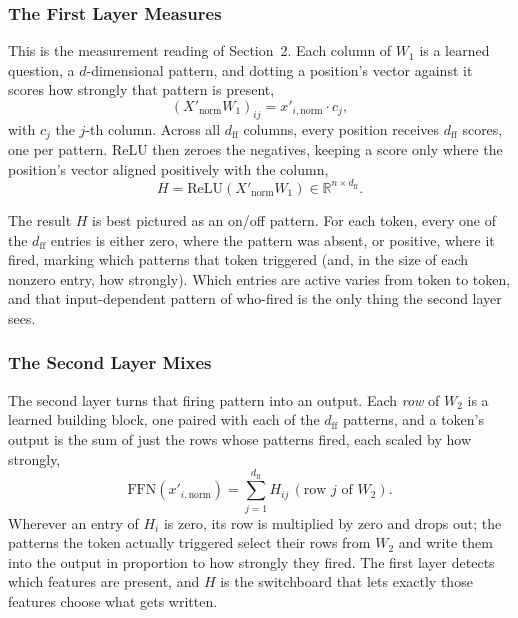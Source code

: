 \documentclass[11pt]{article}
\begin{document}
\subsubsection*{The First Layer Measures}

This is the measurement reading of Section~2. Each column of $W_1$ is a learned question, a $d$-dimensional pattern, and dotting a position's vector against it scores how strongly that pattern is present,
\[
(X'_{\text{norm}} W_1)_{ij} = x'_{i,\text{norm}} \cdot c_j,
\]
with $c_j$ the $j$-th column. Across all $d_{\text{ff}}$ columns, every position receives $d_{\text{ff}}$ scores, one per pattern. ReLU then zeroes the negatives, keeping a score only where the position's vector aligned positively with the column,
\[
H = \text{ReLU}(X'_{\text{norm}} W_1) \in \mathbb{R}^{n \times d_{\text{ff}}}.
\]

The result $H$ is best pictured as an on/off pattern. For each token, every one of the $d_{\text{ff}}$ entries is either zero, where the pattern was absent, or positive, where it fired, marking which patterns that token triggered (and, in the size of each nonzero entry, how strongly). Which entries are active varies from token to token, and that input-dependent pattern of who-fired is the only thing the second layer sees.

\subsubsection*{The Second Layer Mixes}

The second layer turns that firing pattern into an output. Each \textit{row} of $W_2$ is a learned building block, one paired with each of the $d_{\text{ff}}$ patterns, and a token's output is the sum of just the rows whose patterns fired, each scaled by how strongly,
\[
\text{FFN}(x'_{i,\text{norm}}) = \sum_{j=1}^{d_{\text{ff}}} H_{ij}\,(\text{row } j \text{ of } W_2).
\]
Wherever an entry of $H_i$ is zero, its row is multiplied by zero and drops out; the patterns the token actually triggered select their rows from $W_2$ and write them into the output in proportion to how strongly they fired. The first layer detects which features are present, and $H$ is the switchboard that lets exactly those features choose what gets written.

\end{document}
